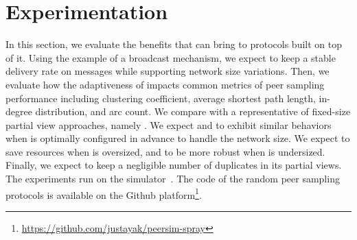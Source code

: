 \section{Experimentation}
\label{sec:experimentation}

In this section, we evaluate the benefits that \SPRAY can bring to
protocols built on top of it. Using the example of a broadcast
mechanism, we expect \SPRAY to keep a stable delivery rate on messages
while supporting network size variations. Then, we evaluate how the
adaptiveness of \SPRAY impacts common metrics of peer sampling
performance including clustering coefficient, average shortest path
length, in-degree distribution, and arc count. We compare \SPRAY with
a representative of fixed-size partial view approaches, namely
\CYCLON. We expect \SPRAY and \CYCLON to exhibit similar behaviors
when \CYCLON is optimally configured in advance to handle the network
size. We expect \SPRAY to save resources when \CYCLON is oversized,
and to be more robust when \CYCLON is undersized. Finally, we expect
\SPRAY to keep a negligible number of duplicates in its partial
views. The experiments run on the \PEERSIM
simulator~\cite{montresor2009peersim}. The code of the random peer
sampling protocols is available on the Github
platform\footnote{\url{https://github.com/justayak/peersim-spray}}.









